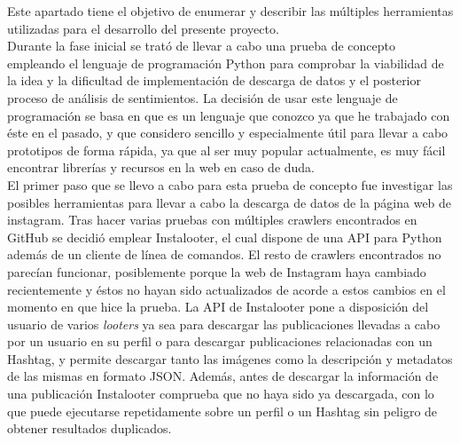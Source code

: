 

Este apartado tiene el objetivo de enumerar y describir las múltiples herramientas utilizadas para el desarrollo del presente proyecto.\\

Durante la fase inicial se trató de llevar a cabo una prueba de concepto empleando el lenguaje de programación Python para comprobar la viabilidad de la idea y la dificultad de implementación de descarga de datos y el posterior proceso de análisis de sentimientos. La decisión de usar este lenguaje de programación se basa en que es un lenguaje que conozco ya que he trabajado con éste en el pasado, y que considero sencillo y especialmente útil para llevar a cabo prototipos de forma rápida, ya que al ser muy popular actualmente, es muy fácil encontrar librerías y recursos en la web en caso de duda.\\

El primer paso que se llevo a cabo para esta prueba de concepto fue investigar las posibles herramientas para llevar a cabo la descarga de datos de la página web de instagram. Tras hacer varias pruebas con múltiples crawlers encontrados en GitHub se decidió emplear Instalooter, el cual dispone de una API para Python además de un cliente de línea de comandos. El resto de crawlers encontrados no parecían funcionar, posiblemente porque la web de Instagram haya cambiado recientemente y éstos no hayan sido actualizados de acorde a estos cambios en el momento en que hice la prueba. La API de Instalooter pone a disposición del usuario de varios \textit{looters} ya sea para descargar las publicaciones llevadas a cabo por un usuario en su perfil o para descargar publicaciones relacionadas con un Hashtag, y permite descargar tanto las imágenes como la descripción y metadatos de las mismas en formato JSON. Además, antes de descargar la información de una publicación Instalooter comprueba que no haya sido ya descargada, con lo que puede ejecutarse repetidamente sobre un perfil o un Hashtag sin peligro de obtener resultados duplicados.\\

